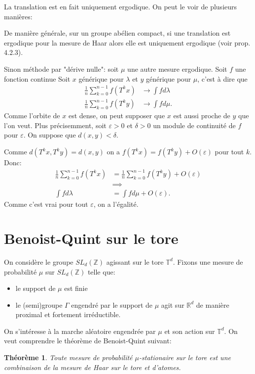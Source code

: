 \documentclass[12pt, a4paper,oneside]{amsart} %
\newtheorem{theorem}{Théorème}
\theoremstyle{definition}
\theoremstyle{remark}
\theoremstyle{remark}
\newcommand\R{\mathbb{R}}
\newcommand\Z{\mathbb{Z}}
\newcommand\T{\mathbb{T}}
\begin{document}
La translation est en fait uniquement
ergodique. On peut le voir de plusieurs manières:

De manière générale, sur un groupe
abélien compact, si une translation est ergodique
pour la mesure de Haar alors elle est uniquement ergodique
(voir \cite{katokIntroductionModernTheory1995} prop. 4.2.3).

Sinon méthode par "dérive nulle":
soit $ \mu $ une autre mesure ergodique.
Soit $ f $  une fonction continue
Soit $ x $ générique pour $ \lambda $
et $ y $ générique pour $ \mu $,
c'est à dire que
\begin{align}
	\frac{1}{n}
	\sum_{k=0}^{n-1}
	f(T^{k} x)
	&\to
	\int
	f
	d \lambda
	\\
	\frac{1}{n}
	\sum_{k=0}^{n-1}
	f(T^{k} y)
	&\to
	\int
	f
	d \mu.
\end{align}
Comme l'orbite de $ x $
est dense, on peut supposer
que $ x $ est aussi proche de $ y $
que l'on veut.
Plus précisemment, soit $ \varepsilon > 0 $
et $ \delta > 0 $ un module de continuité de
$ f $ pour $ \varepsilon $.
On suppose que $ d(x,y) < \delta $.

Comme $ d(T^{k}x, T^{k} y) = d(x,y) $
on a
$ 
f(T^{k}x)
=f(T^{k} y)
+ O( \varepsilon)
$ 
pour tout $ k $.
Donc:
\begin{align}
	\frac{1}{n}
	\sum_{k=0}^{n-1}
	f(T^{k} x)
	&=
	\frac{1}{n}
	\sum_{k=0}^{n-1}
	f(T^{k} y)
	+
	O(\varepsilon)
	\\
	& \implies
	\\
	\int
	f
	d \lambda
	&=
	\int
	f
	d \mu
	+
	O(\varepsilon)
	.
\end{align}
Comme c'est vrai pour tout $ \varepsilon $,
on a l'égalité.

\section{Benoist-Quint sur le tore}
\label{sec:BQ_tore}

On considère le groupe
$ SL_{d} (\Z) $
agissant sur le tore
$ \T^{d} $.
Fixons une mesure de probabilité
$ \mu $ sur $ SL_{d} (\Z) $
telle que:
\begin{itemize}
	\item le support de $ \mu $ est finie
	\item le (semi)groupe
		$ \Gamma $
		engendré par
		le support de $ \mu $
		agit
		sur $ \R^{d} $
		de manière proximal
		et
		fortement irréductible.
\end{itemize}
On s'intéresse à la marche aléatoire
engendrée par $ \mu $ et son action
sur $ \T^{d} $.
On veut comprendre le théorème
de Benoist-Quint \cite{benoistMesuresStationnairesFermes2011}
suivant:
\begin{theorem}
	Toute mesure de probabilité
	$ \mu $-stationaire sur le tore
	est une combinaison
	de la mesure de Haar sur le tore
	et d'atomes.
\end{theorem}
\end{document}
